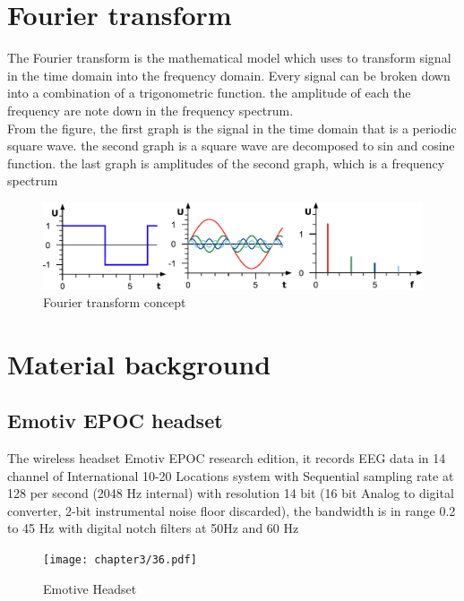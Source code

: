 \section{Fourier transform}
The Fourier transform is the mathematical model which uses to transform signal in the time domain into the frequency domain. Every signal can be broken down into a combination of a trigonometric function.  the amplitude of each the frequency are note down in the frequency spectrum. \\
From the figure, the first graph is the signal in the time domain that is a periodic square wave. the second graph is a square wave are decomposed to sin and cosine function. the last graph is amplitudes of the second graph, which is a frequency spectrum \\
\begin{figure}[ht]
	\centering
	\includegraphics[scale = 0.75]{chapter3/ft.pdf}
	\caption{Fourier transform concept\cite{ft}}
\end{figure}

\newpage
\section{Material background}

\subsection{Emotiv EPOC headset\cite{ref12}}

\hspace{1.5cm} The wireless headset Emotiv EPOC research edition, it records EEG data in 14 channel of International 10-20 Locations system with Sequential sampling rate at 128 per second (2048 Hz internal) with resolution 14 bit (16 bit Analog to digital converter, 2-bit instrumental noise floor discarded), the bandwidth is in range 0.2 to 45 Hz with digital notch filters at 50Hz and 60 Hz

\begin{figure}[ht]
	\centering
	\texttt{[image: chapter3/36.pdf]}
	\caption{Emotive Headset}
\end{figure}

